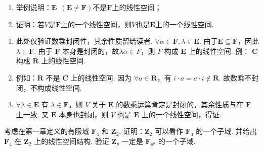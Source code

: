 \begin{exercise}
\begin{exgroup}
\begin{enumerate}
            \item 举例说明：$\mathbf{E}\enspace(\mathbf{E}\neq \mathbf{F})$不是$\mathbf{F}$上的线性空间；

            \item 证明：若$V$是$\mathbf{F}$上的一个线性空间，则$V$也是$\mathbf{E}$上的一个线性空间.
        \end{enumerate}
        \begin{answer}
            \begin{enumerate}
                \item 此处仅验证数乘封闭性，其余性质留给读者. $\forall \alpha\in \mathbf{F},\lambda\in \mathbf{E}$. 由于$\mathbf{E}\subseteq \mathbf{F}$，因此$\lambda\in \mathbf{F}$. 由于 $\mathbf{F}$ 本身是封闭的，故$\lambda\alpha\in F$，则 $F$ 构成 $\mathbf{E}$ 上的线性空间. 例： $\mathbf{C}$ 构成 $\mathbf{R}$ 上的线性空间.

                \item 例如：$\mathbf{R}$ 不是 $\mathbf{C}$ 上的线性空间. 因为 $\forall a\in\mathbf{R}$，有 $i\cdot a=a\cdot i\not\in\mathbf{R}$. 故数乘不封闭，不构成线性空间.

                \item $\forall\lambda\in \mathbf{E}$ 有 $\lambda\in \mathbf{F}$，则 $V$ 关于 $\mathbf{E}$ 的数乘运算肯定是封闭的，其余性质与在 $\mathbf{F}$ 上一致. 又 $\mathbf{E}$ 本身也封闭，则 $V$ 也是 $\mathbf{E}$ 上的一个线性空间，得证.
            \end{enumerate}
        \end{answer}

        \item 考虑在第一章定义的有限域 $\mathbf{F}_4$ 和 $\mathbf{Z}_2$. 证明：$\mathbf{Z}_2$ 可以看作 $\mathbf{F}_4$ 的一个子域. 并给出 $\mathbf{F}_4$ 在 $\mathbf{Z}_2$ 上的线性空间结构. 验证 $\mathbf{Z}_p$ 一定是 $\mathbf{F}_{p^n}$ 的一个子域.
    \end{exgroup}
\end{exercise}
